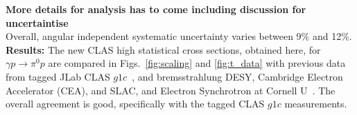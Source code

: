 \documentclass[aps,prc,onecolumn,floatfix,showpacs,preprintnumbers,amsmath,amssymb,superscriptaddress]{revtex4-1}
\begin{document}
\textbf{More details for analysis has to come including 
discussion for uncertaintise}\\

Overall, angular independent systematic uncertainty varies between
9\% and 12\%.\\

\textbf{Results:} The new CLAS high statistical cross sections, 
obtained here, for $\gamma p\to\pi^0p$ are compared in 
Figs.~\ref{fig:scaling} and \ref{fig:t_data} with previous data 
from tagged JLab CLAS $g1c$~\cite{du07}, and bremsstrahlung DESY, 
Cambridge Electron Accelerator (CEA), and SLAC, and Electron 
Synchrotron at Cornell U~\cite{brem}. The overall agreement is 
good, specifically with the tagged CLAS $g1c$ measurements.
\end{document}
